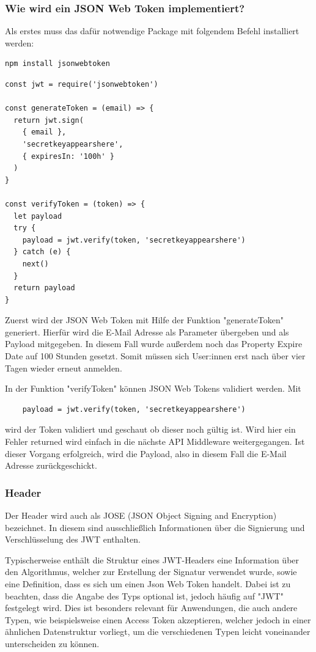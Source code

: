\subsubsection{Wie wird ein JSON Web Token implementiert?}

Als erstes muss das dafür notwendige Package mit folgendem Befehl installiert werden:

\begin{lstlisting}
npm install jsonwebtoken
\end{lstlisting}


\begin{lstlisting}
const jwt = require('jsonwebtoken')

const generateToken = (email) => {
  return jwt.sign(
    { email },
    'secretkeyappearshere',
    { expiresIn: '100h' }
  )
}

const verifyToken = (token) => {
  let payload
  try {
    payload = jwt.verify(token, 'secretkeyappearshere')
  } catch (e) {
    next()
  }
  return payload
}
\end{lstlisting}

Zuerst wird der JSON Web Token mit Hilfe der Funktion "generateToken" generiert. Hierfür wird die E-Mail Adresse als Parameter übergeben und als Payload mitgegeben. In diesem Fall wurde außerdem noch das Property Expire Date auf 100 Stunden gesetzt. Somit müssen sich User:innen erst nach über vier Tagen wieder erneut anmelden.

In der Funktion "verifyToken" können JSON Web Tokens validiert werden. Mit

\begin{lstlisting}
    payload = jwt.verify(token, 'secretkeyappearshere')
\end{lstlisting}

wird der Token validiert und geschaut ob dieser noch gültig ist. Wird hier ein Fehler returned wird einfach in die nächste API Middleware weitergegangen. Ist dieser Vorgang erfolgreich, wird die Payload, also in diesem Fall die E-Mail Adresse zurückgeschickt.


\subsubsection{Header}

Der Header wird auch als JOSE (JSON Object Signing and Encryption) bezeichnet. In diesem sind ausschließlich Informationen über die Signierung und Verschlüsselung des JWT enthalten.


Typischerweise enthält die Struktur eines JWT-Headers eine Information über den Algorithmus, welcher zur Erstellung der Signatur verwendet wurde, sowie eine Definition, dass es sich um einen Json Web Token handelt. Dabei ist zu beachten, dass die Angabe des Typs optional ist, jedoch häufig auf "JWT" festgelegt wird. Dies ist besonders relevant für Anwendungen, die auch andere Typen, wie beispielsweise einen Access Token akzeptieren, welcher jedoch in einer ähnlichen Datenstruktur vorliegt, um die verschiedenen Typen leicht voneinander unterscheiden zu können.

